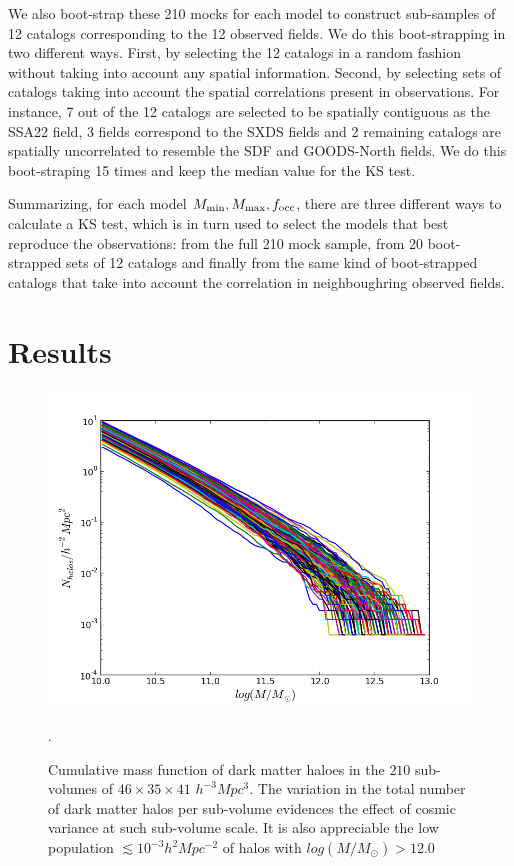 \documentclass{emulateapj}
\begin{document}
We also boot-strap these 210 mocks for each model to construct sub-samples of 12 catalogs corresponding to the 12 observed fields. We do this boot-strapping in two different ways. First, by selecting the 12 catalogs in a random fashion without taking into account any spatial information. Second, by selecting sets of catalogs taking into account the spatial correlations present in observations. For instance, 7 out of the 12 catalogs are selected to be spatially contiguous as the SSA22 field, 3 fields correspond to the SXDS fields and 2 remaining catalogs are spatially uncorrelated to resemble the SDF and GOODS-North fields. We do this boot-straping 15 times and keep the median value for the KS test.

Summarizing, for each model $M_{\rm min}, M_{\rm max}, f_{\rm occ}$, there are three different ways to calculate a KS test, which is in turn used to select the models that best reproduce the observations: from the full 210 mock sample, from 20 boot-strapped sets of 12 catalogs and finally from the same kind of boot-strapped catalogs that take into account the correlation in neighboughring observed fields.



\section{Results}


\begin{figure}
\begin{center}
\includegraphics[width=1.00\linewidth,angle=0]{./plots/cum_halos_tex.png}
\caption{ \label{figure:laes_dist} Cumulative mass function of dark matter haloes in the $210$ sub-volumes of $46\times 35\times 41$ $h^{-3}Mpc^{3}$. The variation in the total number of dark matter halos per sub-volume  evidences the effect of cosmic variance at such sub-volume scale. It is also appreciable the low population $\lesssim10^{-3}h^{2}Mpc^{-2}$ of halos with $log(M/M_{\odot})>12.0$}.
\end{center} 
\end{figure}
\end{document}

